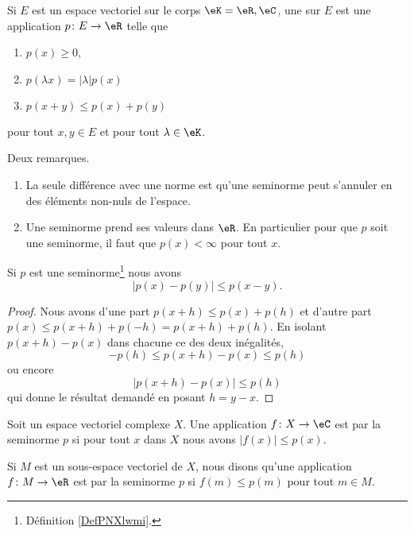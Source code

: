 \begin{definition}  \label{DefPNXlwmi}
	Si \( E\) est un espace vectoriel sur le corps \( \eK=\eR,\eC\), une  sur \( E\) est une application \( p\colon E\to \eR\) telle que
	\begin{enumerate}
		\item
		      \( p(x)\geq 0\),
		\item   \label{ItemSHnimhDii}
		      \( p(\lambda x)=| \lambda |p(x)\)
		\item   \label{ItemSHnimhDiii}
		      \( p(x+y)\leq p(x)+p(y)\)
	\end{enumerate}
	pour tout \( x,y\in E\) et pour tout \( \lambda\in \eK\).
\end{definition}

\begin{remark}
	Deux remarques.
	\begin{enumerate}
		\item
		      La seule différence avec une norme est qu'une seminorme peut s'annuler en des éléments non-nuls de l'espace.
		\item
		      Une seminorme prend ses valeurs dans \( \eR\). En particulier pour que \( p\) soit une seminorme, il faut que \( p(x)<\infty\) pour tout \( x\).
	\end{enumerate}
\end{remark}


\begin{lemma}		\label{LEMooHTOAooGmRGZL}
	Si \( p\) est une seminorme\footnote{Définition \ref{DefPNXlwmi}.} nous avons
	\begin{equation}
		| p(x)-p(y) |\leq p(x-y).
	\end{equation}
\end{lemma}

\begin{proof}
	Nous avons d'une part \( p(x+h)\leq p(x)+p(h)\) et d'autre part \( p(x)\leq p(x+h)+p(-h)=p(x+h)+p(h)\). En isolant \( p(x+h)-p(x)\) dans chacune ce des deux inégalités,
	\begin{equation}
		-p(h)\leq p(x+h)-p(x)\leq p(h)
	\end{equation}
	ou encore
	\begin{equation}
		|p(x+h)-p(x)|\leq p(h)
	\end{equation}
	qui donne le résultat demandé en posant \( h=y-x\).
\end{proof}

\begin{definition}		\label{DEFooNFOAooRAUuOk}
	Soit un espace vectoriel complexe \( X\). Une application \(f \colon X\to \eC  \) est  par la seminorme \( p\) si pour tout \( x\) dans \( X\) nous avons \( | f(x) |\leq p(x)\).

	Si \( M\) est un sous-espace vectoriel de \( X\), nous disons qu'une application \(f \colon M\to \eR  \) est  par la seminorme \( p\) si \( f(m)\leq p(m)\) pour tout \( m\in M\).
\end{definition}

